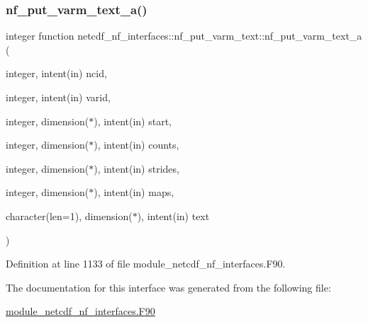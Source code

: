 \subsubsection{\texorpdfstring{nf\+\_\+put\+\_\+varm\+\_\+text\+\_\+a()}{nf\_put\_varm\_text\_a()}}
{\footnotesize\ttfamily integer function netcdf\+\_\+nf\+\_\+interfaces\+::nf\+\_\+put\+\_\+varm\+\_\+text\+::nf\+\_\+put\+\_\+varm\+\_\+text\+\_\+a (\begin{DoxyParamCaption}\item[{integer, intent(in)}]{ncid,  }\item[{integer, intent(in)}]{varid,  }\item[{integer, dimension($\ast$), intent(in)}]{start,  }\item[{integer, dimension($\ast$), intent(in)}]{counts,  }\item[{integer, dimension($\ast$), intent(in)}]{strides,  }\item[{integer, dimension($\ast$), intent(in)}]{maps,  }\item[{character(len=1), dimension($\ast$), intent(in)}]{text }\end{DoxyParamCaption})}



Definition at line 1133 of file module\+\_\+netcdf\+\_\+nf\+\_\+interfaces.\+F90.



The documentation for this interface was generated from the following file\+:\begin{DoxyCompactItemize}
\item 
\hyperlink{module__netcdf__nf__interfaces_8F90}{module\+\_\+netcdf\+\_\+nf\+\_\+interfaces.\+F90}\end{DoxyCompactItemize}
